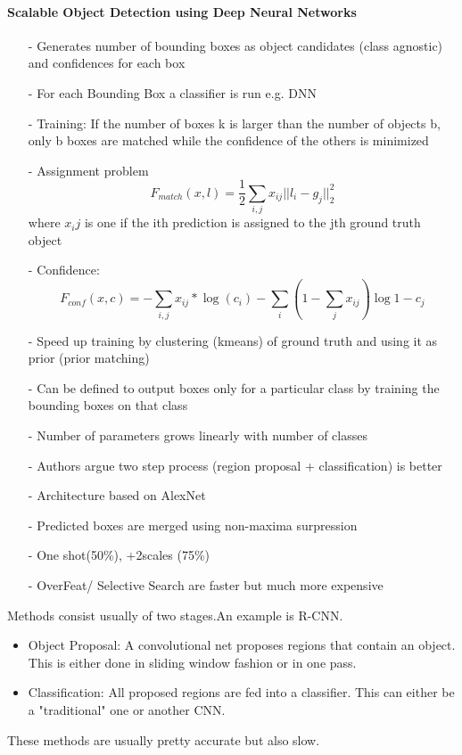 			\paragraph{Scalable Object Detection using Deep Neural Networks\cite{Erhan}}
			\begin{itemize}
				\item[-] Generates number of bounding boxes as object candidates (class agnostic) and confidences for each box
				\item[-] For each Bounding Box a classifier is run e.g. DNN
				\item[-] Training: If the number of boxes k is larger than the number of objects b, only b boxes are matched while the confidence of the others is minimized
				\item[-] Assignment problem $$F_{match}(x,l) = \frac{1}{2}\sum_{i,j}x_{ij}||l_i - g_j||^2_2$$ where $x_ij$ is one if the ith prediction is assigned to the jth ground truth object
				\item[-] Confidence: 
				$$F_{conf}(x,c) = - \sum_{i,j}x_{ij}*\log(c_i)-\sum_{i}(1-\sum_{j}x_{ij})\log{1-c_j}$$
				\item[-] Speed up training by clustering (kmeans) of ground truth and using it as prior (prior matching)
				\item[-] Can be defined to output boxes only for a particular class by training the bounding boxes on that class
				\item[-] Number of parameters grows linearly with number of classes
				\item[-] Authors argue two step process (region proposal + classification) is better
				\item[-] Architecture based on AlexNet
				\item[-] Predicted boxes are merged using non-maxima surpression
				\item[-] One shot(50\%), +2scales (75\%)
				\item[-] OverFeat/ Selective Search are faster but much more expensive
			\end{itemize}
			
	
	Methods consist usually of two stages.An example is R-CNN\cite{Ren}. 
	\begin{itemize}
		\item Object Proposal: A convolutional net proposes regions that contain an object. This is either done in sliding window fashion or in one pass.
		\item Classification: All proposed regions are fed into a classifier. This can either be a "traditional" one or another CNN.
	\end{itemize}
	These methods are usually pretty accurate but also slow.
